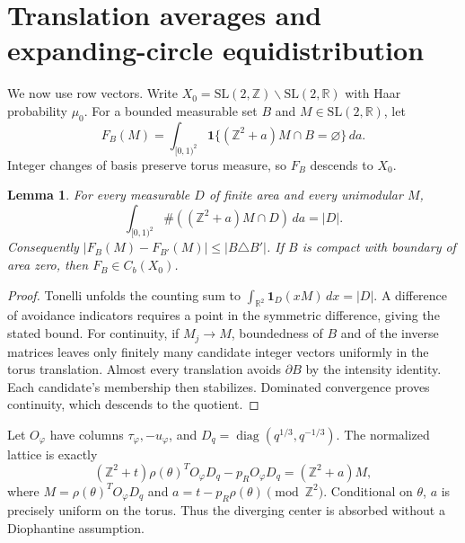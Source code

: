 \documentclass[11pt,a4paper]{article}
\newcommand{\R}{\mathbb R}\newcommand{\Z}{\mathbb Z}
\newtheorem{lemma}{Lemma}\newtheorem{corollary}{Corollary}
\theoremstyle{remark}\newtheorem{remark}{Remark}
\numberwithin{equation}{section}
\begin{document}
\section{Translation averages and expanding-circle equidistribution}\label{sec:cv}
We now use row vectors. Write $X_0=\mathrm{SL}(2,\Z)\backslash\mathrm{SL}(2,\R)$ with Haar probability $\mu_0$. For a bounded measurable set $B$ and $M\in\mathrm{SL}(2,\R)$, let
\begin{equation}\label{eq:FB}
 F_B(M)=\int_{[0,1)^2}\mathbf1\{(\Z^2+a)M\cap B=\varnothing\}\,da.
\end{equation}
Integer changes of basis preserve torus measure, so $F_B$ descends to $X_0$.

\begin{lemma}\label{lem:translation}
For every measurable $D$ of finite area and every unimodular $M$,
\[
 \int_{[0,1)^2}\#((\Z^2+a)M\cap D)\,da=|D|.
\]
Consequently $|F_B(M)-F_{B'}(M)|\le|B\triangle B'|$. If $B$ is compact with boundary of area zero, then $F_B\in C_b(X_0)$.
\end{lemma}
\begin{proof}
Tonelli unfolds the counting sum to $\int_{\R^2}\mathbf1_D(xM)\,dx=|D|$. A difference of avoidance indicators requires a point in the symmetric difference, giving the stated bound. For continuity, if $M_j\to M$, boundedness of $B$ and of the inverse matrices leaves only finitely many candidate integer vectors uniformly in the torus translation. Almost every translation avoids $\partial B$ by the intensity identity. Each candidate's membership then stabilizes. Dominated convergence proves continuity, which descends to the quotient.
\end{proof}

Let $O_\varphi$ have columns $\tau_\varphi,-u_\varphi$, and $D_q=\operatorname{diag}(q^{1/3},q^{-1/3})$. The normalized lattice is exactly
\begin{equation}\label{eq:centering}
 (\Z^2+t)\rho(\theta)^TO_\varphi D_q-p_RO_\varphi D_q
 =(\Z^2+a)M,
\end{equation}
where $M=\rho(\theta)^TO_\varphi D_q$ and $a=t-p_R\rho(\theta)\pmod{\Z^2}$. Conditional on $\theta$, $a$ is precisely uniform on the torus. Thus the diverging center is absorbed without a Diophantine assumption.
\end{document}
